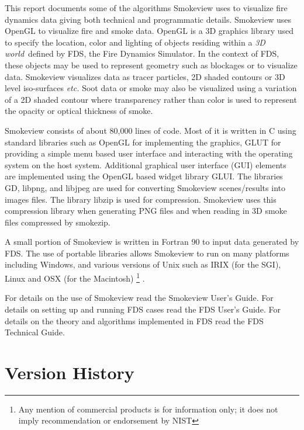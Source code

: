 \documentclass[11pt,twoside]{book}
\begin{document}
This report documents some of the algorithms Smokeview uses to visualize fire dynamics data giving both technical and programmatic details.
Smokeview uses OpenGL to visualize fire and smoke data.  OpenGL
is a 3D graphics library used to specify the location, color and
lighting of objects residing within a {\em 3D world}\ defined by FDS,
the Fire Dynamics Simulator. In the context of FDS, these objects
may be used to represent geometry such as blockages or to
visualize data. Smokeview visualizes data as tracer particles, 2D
shaded contours or 3D level iso-surfaces {\em etc.}  Soot data or
smoke may also be visualized using a variation of a 2D shaded
contour where transparency rather than color is used to represent
the opacity or optical thickness of smoke.


Smokeview consists of about 80,000 lines of code.  Most of it is
written in C using standard libraries such as
OpenGL\cite{OpenGLRed} for implementing the graphics, GLUT\cite{OpenGLGlut} for providing a
simple menu based user interface and interacting with the operating system on the host system.
Additional graphical user interface (GUI) elements are implemented using the
OpenGL based widget library GLUI\cite{GLUILIB}.
The libraries GD\cite{GDLIB}, libpng\cite{PNGLIB},
and libjpeg\cite{JPEGLIB} are used for converting Smokeview scenes/results into images files.
The library
libzip\cite{ZLIB} is used for compression.
Smokeview uses this compression library when generating PNG files and when reading in 3D smoke files compressed by smokezip.

A small portion of Smokeview is written in Fortran 90 to input data
generated by FDS.  The use of portable libraries allows Smokeview
to run on many platforms including Windows, and various versions
of Unix such as IRIX (for the SGI), Linux and OSX (for the
Macintosh)
\footnote{
Any mention of commercial products is for information only;  it does not imply recommendation or endorsement by NIST}
.

For details on the use of Smokeview read the Smokeview User's
Guide\cite{Smokeview_Users_Guide_5}. For details on setting up and
running FDS cases read the FDS User's
Guide\cite{FDS_Users_Guide_5}.  For details on the theory and algorithms implemented in FDS
read the FDS Technical Guide\cite{FDS_Tech_Guide_5}.

\section{Version History}
\end{document}
